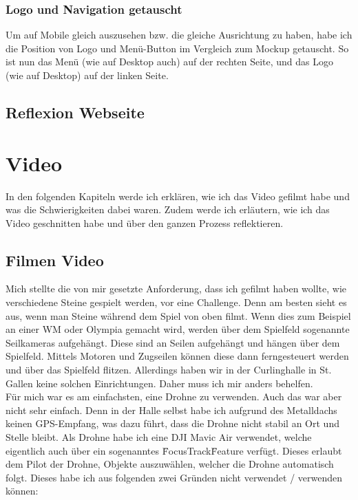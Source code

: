 \documentclass[11pt]{article}
\begin{document}
    \subsubsection{Logo und Navigation getauscht}
    Um auf Mobile gleich auszusehen bzw. die gleiche Ausrichtung zu haben, habe ich die Position von Logo und Menü-Button im Vergleich zum Mockup
    getauscht. So ist nun das Menü (wie auf Desktop auch) auf der rechten Seite, und das Logo (wie auf Desktop) auf der linken Seite.

    \subsection{Reflexion Webseite}

    \section{Video}
    In den folgenden Kapiteln werde ich erklären, wie ich das Video gefilmt habe und was die Schwierigkeiten dabei waren. Zudem werde ich
    erläutern, wie ich das Video geschnitten habe und über den ganzen Prozess reflektieren.

    \subsection{Filmen Video}
    Mich stellte die von mir gesetzte Anforderung, dass ich gefilmt haben wollte, wie verschiedene Steine gespielt werden, vor eine Challenge.
    Denn am besten sieht es aus, wenn man Steine während dem Spiel von oben filmt. Wenn dies zum Beispiel an einer WM oder Olympia gemacht wird,
    werden über dem Spielfeld sogenannte Seilkameras aufgehängt. Diese sind an Seilen aufgehängt und hängen über dem Spielfeld. Mittels Motoren
    und Zugseilen können diese dann ferngesteuert werden und über das Spielfeld flitzen. Allerdings haben wir in der Curlinghalle in St. Gallen
    keine solchen Einrichtungen. Daher muss ich mir anders behelfen.\\
    Für mich war es am einfachsten, eine Drohne zu verwenden. Auch das war aber nicht sehr einfach. Denn in der Halle selbst habe ich aufgrund
    des Metalldachs keinen GPS-Empfang, was dazu führt, dass die Drohne nicht stabil an Ort und Stelle bleibt.
    Als Drohne habe ich eine DJI Mavic Air verwendet, welche eigentlich auch über ein sogenanntes \"FocusTrack\" Feature verfügt. Dieses erlaubt dem
    Pilot der Drohne, Objekte auszuwählen, welcher die Drohne automatisch folgt. Dieses habe ich aus folgenden zwei Gründen nicht verwendet
    / verwenden können:
\end{document}
